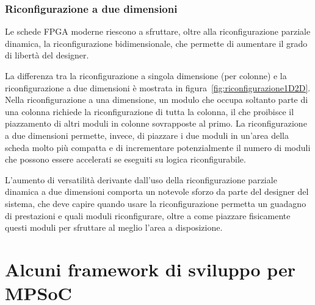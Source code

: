 \subsubsection{Riconfigurazione a due dimensioni}
Le schede \ac{FPGA} moderne riescono a sfruttare, oltre alla riconfigurazione parziale
dinamica, la riconfigurazione bidimensionale, che permette di aumentare il grado di
libertà del designer.

La differenza tra la riconfigurazione a singola dimensione (per colonne) e la
riconfigurazione a due dimensioni è mostrata in figura~\ref{fig:riconfigurazione1D2D}.
Nella riconfigurazione a una dimensione, un modulo che occupa soltanto parte di una
colonna richiede la riconfigurazione di tutta la colonna, il che proibisce il piazzamento
di altri moduli in colonne sovrapposte al primo. La riconfigurazione a due dimensioni
permette, invece, di piazzare i due moduli in un'area della scheda molto più compatta e di
incrementare potenzialmente il numero di moduli che possono essere accelerati se eseguiti
su logica riconfigurabile.

L'aumento di versatilità derivante dall'uso della riconfigurazione parziale dinamica
a due dimensioni comporta un notevole sforzo da parte del designer del sistema,
che deve capire quando usare la riconfigurazione permetta un guadagno di prestazioni
e quali moduli riconfigurare, oltre a come piazzare fisicamente questi moduli per sfruttare al
meglio l'area a disposizione.


\section[Alcuni framework di sviluppo per \acs{MPSoC}]{Alcuni framework di sviluppo per \acs{MPSoC}}
\label{sec:flussiLetteratura}
